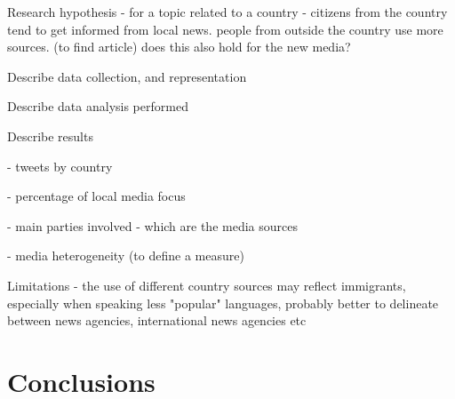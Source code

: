 \documentclass{acm_proc_10ptArticle-sp}
\begin{document}
Research hypothesis - for a topic related to a country - citizens from the country tend to get informed from local news. people from outside the country use more sources. (to find article) does this also hold for the new media?

Describe data collection, and representation

Describe data analysis performed

Describe results

- tweets by country

- percentage of local media focus

- main parties involved - which are the media sources

- media heterogeneity (to define a measure)

Limitations - the use of different country sources may reflect immigrants, especially when speaking less "popular" languages, probably better to delineate between news agencies, international news agencies etc

\section{Conclusions} 



\end{document}
